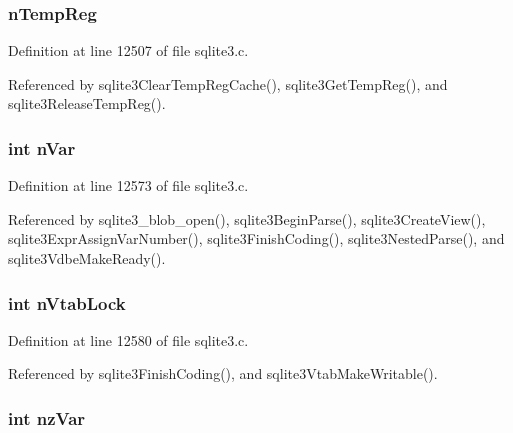 \subsubsection[{n\+Temp\+Reg}]{ n\+Temp\+Reg}\label{struct_parse_a41f182977278836caadbc1a77ee4a7fc}


Definition at line 12507 of file sqlite3.\+c.



Referenced by sqlite3\+Clear\+Temp\+Reg\+Cache(), sqlite3\+Get\+Temp\+Reg(), and sqlite3\+Release\+Temp\+Reg().

\hypertarget{struct_parse_a4daa0b7f57ad0254db068b40eaa0d8b9}{}
\subsubsection[{n\+Var}]{\setlength{\rightskip}{0pt plus 5cm}int n\+Var}\label{struct_parse_a4daa0b7f57ad0254db068b40eaa0d8b9}


Definition at line 12573 of file sqlite3.\+c.



Referenced by sqlite3\+\_\+blob\+\_\+open(), sqlite3\+Begin\+Parse(), sqlite3\+Create\+View(), sqlite3\+Expr\+Assign\+Var\+Number(), sqlite3\+Finish\+Coding(), sqlite3\+Nested\+Parse(), and sqlite3\+Vdbe\+Make\+Ready().

\hypertarget{struct_parse_ac2e869640141f1ea530ea807d40a0a8f}{}
\subsubsection[{n\+Vtab\+Lock}]{\setlength{\rightskip}{0pt plus 5cm}int n\+Vtab\+Lock}\label{struct_parse_ac2e869640141f1ea530ea807d40a0a8f}


Definition at line 12580 of file sqlite3.\+c.



Referenced by sqlite3\+Finish\+Coding(), and sqlite3\+Vtab\+Make\+Writable().

\hypertarget{struct_parse_aeb9c5f4bed2bb8dfd350896fe67e9312}{}
\subsubsection[{nz\+Var}]{\setlength{\rightskip}{0pt plus 5cm}int nz\+Var}\label{struct_parse_aeb9c5f4bed2bb8dfd350896fe67e9312}


